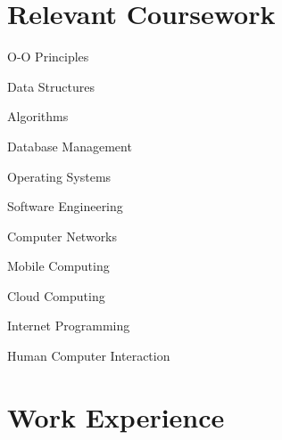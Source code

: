 \documentclass[letterpaper]{resume_config}
\begin{document}
\section{Relevant Coursework}
\vspace{-5pt}
\begin{SkillsList}{
    \item{O-O Principles}
    \item{Data Structures}
    \item{Algorithms}
    \item{Database Management}
    \item{Operating Systems}
    \item{Software Engineering}
    \item{Computer Networks}
    \item{Mobile Computing}
    \item{Cloud Computing}
    \item{Internet Programming}
    \item{Human Computer Interaction}
}
\end{SkillsList}

\vspace{-20pt}


\section{Work Experience}
\end{document}
